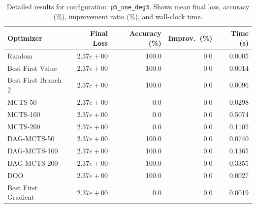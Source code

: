 \begin{table}[H]
\centering
\caption{Detailed results for configuration: \texttt{p5\_one\_deg3}. Shows mean final loss, accuracy (\%), improvement ratio (\%), and wall-clock time.}
\label{tab:funclearn-detail-23}
\begin{tabular}{lrrrr}
\toprule
Optimizer & Final Loss & Accuracy (\%) & Improv.~(\%) & Time (s) \\
\midrule
Random & \textbf{$2.37e+00$} & 100.0 & 0.0 & 0.0005 \\
\hline
Best First Value & \textbf{$2.37e+00$} & 100.0 & 0.0 & 0.0014 \\
\hline
Best First Branch 2 & \textbf{$2.37e+00$} & 100.0 & 0.0 & 0.0096 \\
\hline
MCTS-50 & \textbf{$2.37e+00$} & 0.0 & 0.0 & 0.0298 \\
\hline
MCTS-100 & \textbf{$2.37e+00$} & 0.0 & 0.0 & 0.5074 \\
\hline
MCTS-200 & \textbf{$2.37e+00$} & 0.0 & 0.0 & 0.1105 \\
\hline
DAG-MCTS-50 & \textbf{$2.37e+00$} & 100.0 & 0.0 & 0.0740 \\
\hline
DAG-MCTS-100 & \textbf{$2.37e+00$} & 100.0 & 0.0 & 0.1365 \\
\hline
DAG-MCTS-200 & \textbf{$2.37e+00$} & 100.0 & 0.0 & 0.3355 \\
\hline
DOO & \textbf{$2.37e+00$} & 100.0 & 0.0 & 0.0027 \\
\hline
Best First Gradient & \textbf{$2.37e+00$} & 0.0 & 0.0 & 0.0019 \\
\bottomrule
\end{tabular}
\end{table}

